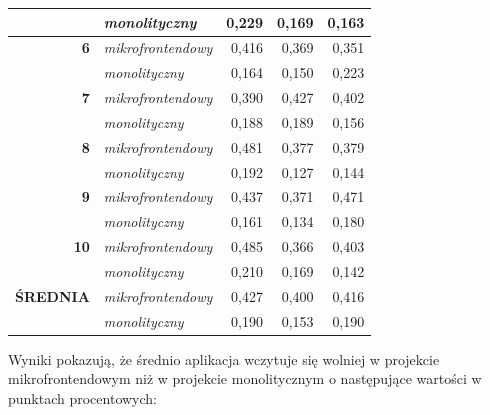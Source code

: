 \documentclass{SGGW-thesis}
\begin{document}
\begin{table}[]
\begin{tabular}{ll|rrr|}
      \multicolumn{1}{|l|}{\textbf{}} & \textit{monolityczny} & \multicolumn{1}{r|}{0,229} & \multicolumn{1}{r|}{0,169} & 0,163 \\ \hline
      \multicolumn{1}{|r|}{\textbf{6}} & \textit{mikrofrontendowy} & \multicolumn{1}{r|}{0,416} & \multicolumn{1}{r|}{0,369} & 0,351 \\ \hline
      \multicolumn{1}{|l|}{\textbf{}} & \textit{monolityczny} & \multicolumn{1}{r|}{0,164} & \multicolumn{1}{r|}{0,150} & 0,223 \\ \hline
      \multicolumn{1}{|r|}{\textbf{7}} & \textit{mikrofrontendowy} & \multicolumn{1}{r|}{0,390} & \multicolumn{1}{r|}{0,427} & 0,402 \\ \hline
      \multicolumn{1}{|l|}{\textbf{}} & \textit{monolityczny} & \multicolumn{1}{r|}{0,188} & \multicolumn{1}{r|}{0,189} & 0,156 \\ \hline
      \multicolumn{1}{|r|}{\textbf{8}} & \textit{mikrofrontendowy} & \multicolumn{1}{r|}{0,481} & \multicolumn{1}{r|}{0,377} & 0,379 \\ \hline
      \multicolumn{1}{|l|}{\textbf{}} & \textit{monolityczny} & \multicolumn{1}{r|}{0,192} & \multicolumn{1}{r|}{0,127} & 0,144 \\ \hline
      \multicolumn{1}{|r|}{\textbf{9}} & \textit{mikrofrontendowy} & \multicolumn{1}{r|}{0,437} & \multicolumn{1}{r|}{0,371} & 0,471 \\ \hline
      \multicolumn{1}{|l|}{\textbf{}} & \textit{monolityczny} & \multicolumn{1}{r|}{0,161} & \multicolumn{1}{r|}{0,134} & 0,180 \\ \hline
      \multicolumn{1}{|r|}{\textbf{10}} & \textit{mikrofrontendowy} & \multicolumn{1}{r|}{0,485} & \multicolumn{1}{r|}{0,366} & 0,403 \\ \hline
      \multicolumn{1}{|l|}{\textbf{}} & \textit{monolityczny} & \multicolumn{1}{r|}{0,210} & \multicolumn{1}{r|}{0,169} & 0,142 \\ \hline\hline
      \multicolumn{1}{|l|}{\textbf{ŚREDNIA}} & \textit{mikrofrontendowy} & \multicolumn{1}{r|}{0,427} & \multicolumn{1}{r|}{0,400} & 0,416 \\ \hline
      \multicolumn{1}{l|}{} & \textit{monolityczny} & \multicolumn{1}{r|}{0,190} & \multicolumn{1}{r|}{0,153} & 0,190 \\ \cline{2-5} 
      \end{tabular}
      \label{table:runtimes_with_cache}
    \end{table}

    Wyniki pokazują, że średnio aplikacja wczytuje się wolniej w projekcie mikrofrontendowym niż w projekcie monolitycznym o następujące wartości w punktach procentowych:
\end{document}
